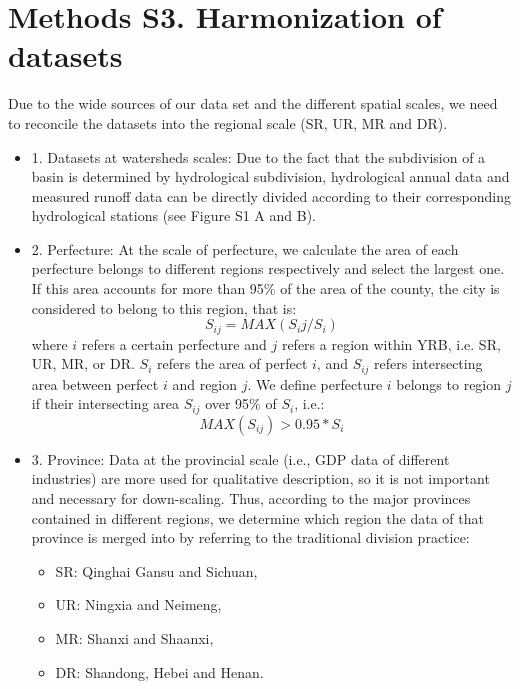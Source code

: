\documentclass[9pt,twoside,lineno]{pnas-new}
\begin{document}
\section*{Methods S3. Harmonization of datasets}
Due to the wide sources of our data set and the different spatial scales, we need to reconcile the datasets into the regional scale (SR, UR, MR and DR).
\begin{itemize}
    \item 1. Datasets at watersheds scales:
        Due to the fact that the subdivision of a basin is determined by hydrological subdivision, hydrological annual data and measured runoff data can be directly divided according to their corresponding hydrological stations (see Figure S1 A and B).
    \item 2. Perfecture:
        At the scale of perfecture, we calculate the area of each perfecture belongs to different regions respectively and select the largest one. If this area accounts for more than 95\% of the area of the county, the city is considered to belong to this region, that is:
        $$ S_{ij} = MAX(S_ij / S_i)$$
        where $i$ refers a certain perfecture and $j$ refers a region within YRB, i.e. SR, UR, MR, or DR. $S_i$ refers the area of perfect $i$, and $S_{ij}$ refers intersecting area between perfect $i$ and region $j$.
        We define perfecture $i$ belongs to region $j$ if their intersecting area $S_{ij}$ over 95\% of $S_i$, i.e.:
        $$ MAX(S_{ij}) > 0.95 * S_i $$
    \item 3. Province:
    Data at the provincial scale (i.e., GDP data of different industries) are more used for qualitative description, so it is not important and necessary for down-scaling. Thus, according to the major provinces contained in different regions, we determine which region the data of that province is merged into by referring to the traditional division practice:
    \begin{itemize}
        \item SR: Qinghai Gansu and Sichuan,
        \item UR: Ningxia and Neimeng,
        \item MR: Shanxi and Shaanxi,
        \item DR: Shandong, Hebei and Henan.
    \end{itemize}
\end{itemize}
\end{document}
